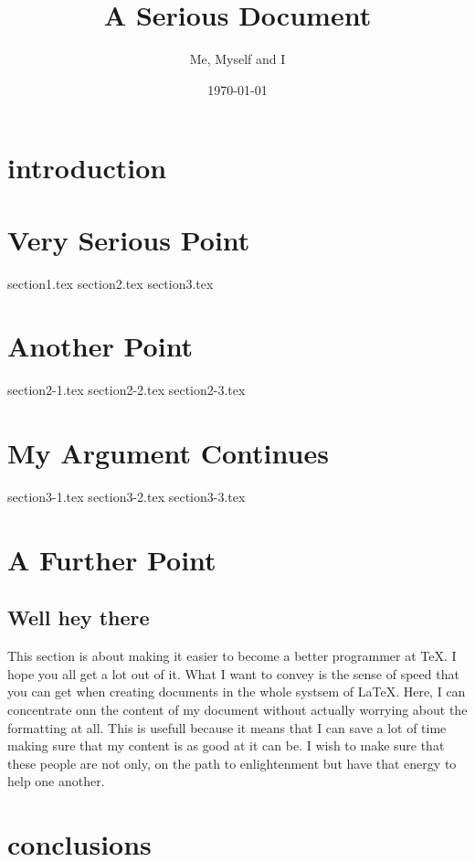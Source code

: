 \documentclass[a4paper]{report}
\title{A Serious Document}
\author{Me, Myself and I}
\date{\today}
\begin{document}
\maketitle

\tableofcontents
\pagebreak

\begin{abstract}

\end{abstract}

\chapter{introduction}


\chapter{Very Serious Point}
{section1.tex}
{section2.tex}
{section3.tex}

\chapter{Another Point}
{section2-1.tex}
{section2-2.tex}
{section2-3.tex}

\chapter{My Argument Continues}
{section3-1.tex}
{section3-2.tex}
{section3-3.tex}

\chapter{A Further Point}
\section{Well hey there}
This section is about making it easier to become a better programmer at \TeX. I hope you all get a lot out of it. What I want to convey is the sense of speed that you can get when creating documents in the whole systsem of \LaTeX. Here, I can concentrate onn the content of my document without actually worrying about the formatting at all. This is usefull because it means that I can save a lot of time making sure that my content is as good at it can be. I wish to make sure that these people are not only, on the path to enlightenment but have that energy to help one another. 

\chapter{conclusions}

\appendix
\end{document}
